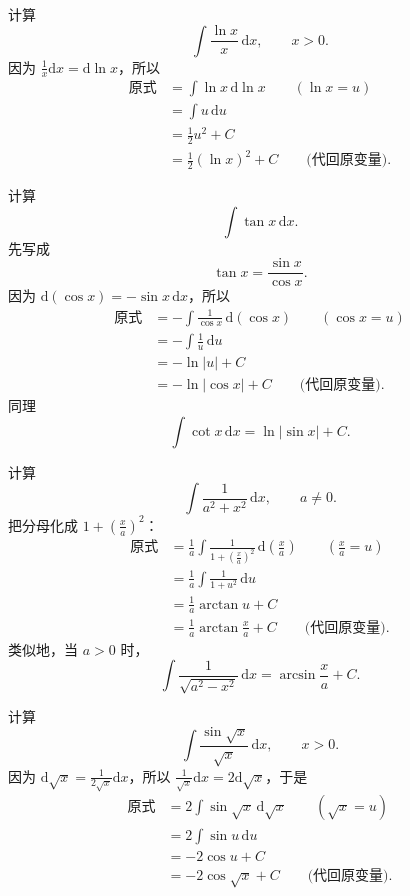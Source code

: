 \documentclass[fontset=fandol]{ctexart}
\newcommand{\dd}{\mathrm{d}}
\begin{document}
\begin{example}[对数换元]
计算
\[
\int \frac{\ln x}{x}\,\dd x,\qquad x>0.
\]
因为 $\frac1x\dd x=\dd\ln x$，所以
\[
\begin{aligned}
\text{原式}
&=\int \ln x\,\dd\ln x\qquad (\ln x=u)\\
&=\int u\,\dd u\\
&=\frac12u^2+C\\
&=\frac12(\ln x)^2+C\qquad \text{(代回原变量)}.
\end{aligned}
\]
\end{example}

\begin{example}[三角函数中的凑微分]
计算
\[
\int \tan x\,\dd x.
\]
先写成
\[
\tan x=\frac{\sin x}{\cos x}.
\]
因为 $\dd(\cos x)=-\sin x\,\dd x$，所以
\[
\begin{aligned}
\text{原式}
&=-\int \frac{1}{\cos x}\,\dd(\cos x)\qquad (\cos x=u)\\
&=-\int \frac1u\,\dd u\\
&=-\ln|u|+C\\
&=-\ln|\cos x|+C\qquad \text{(代回原变量)}.
\end{aligned}
\]
同理
\[
\int \cot x\,\dd x=\ln|\sin x|+C.
\]
\end{example}

\begin{example}[反三角型]
计算
\[
\int \frac{1}{a^2+x^2}\,\dd x,\qquad a\neq0.
\]
把分母化成 $1+(\frac{x}{a})^2$：
\[
\begin{aligned}
\text{原式}
&=\frac1a\int \frac{1}{1+(\frac xa)^2}\,\dd\left(\frac xa\right)\qquad \left(\frac xa=u\right)\\
&=\frac1a\int \frac{1}{1+u^2}\,\dd u\\
&=\frac1a\arctan u+C\\
&=\frac1a\arctan\frac xa+C\qquad \text{(代回原变量)}.
\end{aligned}
\]
类似地，当 $a>0$ 时，
\[
\int \frac{1}{\sqrt{a^2-x^2}}\,\dd x=\arcsin\frac xa+C.
\]
\end{example}

\begin{example}[根式换元]
计算
\[
\int \frac{\sin\sqrt{x}}{\sqrt{x}}\,\dd x,\qquad x>0.
\]
因为 $\dd\sqrt{x}=\frac{1}{2\sqrt{x}}\dd x$，所以 $\frac1{\sqrt{x}}\dd x=2\dd\sqrt{x}$，于是
\[
\begin{aligned}
\text{原式}
&=2\int \sin\sqrt{x}\,\dd\sqrt{x}\qquad (\sqrt{x}=u)\\
&=2\int \sin u\,\dd u\\
&=-2\cos u+C\\
&=-2\cos\sqrt{x}+C\qquad \text{(代回原变量)}.
\end{aligned}
\]
\end{example}
\end{document}
